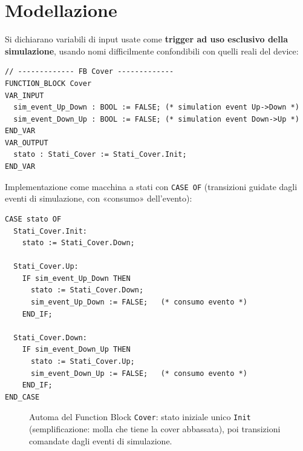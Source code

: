 \section{Modellazione}
Si dichiarano variabili di input usate come \textbf{trigger ad uso esclusivo della simulazione}, usando nomi difficilmente confondibili con quelli reali del device:
\begin{lstlisting}[basicstyle=\ttfamily\small]
// ------------- FB Cover -------------
FUNCTION_BLOCK Cover
VAR_INPUT
  sim_event_Up_Down : BOOL := FALSE; (* simulation event Up->Down *)
  sim_event_Down_Up : BOOL := FALSE; (* simulation event Down->Up *)
END_VAR
VAR_OUTPUT
  stato : Stati_Cover := Stati_Cover.Init;
END_VAR
\end{lstlisting}

Implementazione come macchina a stati con \texttt{CASE OF} (transizioni guidate dagli eventi di simulazione, con «consumo» dell'evento):
\begin{lstlisting}[basicstyle=\ttfamily\small]
CASE stato OF
  Stati_Cover.Init:
    stato := Stati_Cover.Down;

  Stati_Cover.Up:
    IF sim_event_Up_Down THEN
      stato := Stati_Cover.Down;
      sim_event_Up_Down := FALSE;   (* consumo evento *)
    END_IF;

  Stati_Cover.Down:
    IF sim_event_Down_Up THEN
      stato := Stati_Cover.Up;
      sim_event_Down_Up := FALSE;   (* consumo evento *)
    END_IF;
END_CASE
\end{lstlisting}

\begin{figure}[htbp]
\centering
{}
\caption{Automa del Function Block \texttt{Cover}: stato iniziale unico \texttt{Init} (semplificazione: molla che tiene la cover abbassata), poi transizioni comandate dagli eventi di simulazione.}
\label{fig:cover-automaton}
\end{figure}

